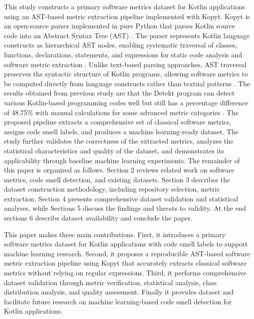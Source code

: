 \documentclass[]{einformatica}
\begin{document}
This study constructs a primary software metrics dataset for Kotlin applications using an AST-based metric extraction pipeline implemented with Kopyt. Kopyt is an open-source parser implemented in pure Python that parses Kotlin source code into an Abstract Syntax Tree (AST) \cite{pypi_kopyt}. The parser represents Kotlin language constructs as hierarchical AST nodes, enabling systematic traversal of classes, functions, declarations, statements, and expressions for static code analysis and software metric extraction \cite{kotlin_spec}. Unlike text-based parsing approaches, AST traversal preserves the syntactic structure of Kotlin programs, allowing software metrics to be computed directly from language constructs rather than textual patterns \cite{chen2023acerastbasedgraphgenerator}. The results obtained from previous study are that the Detekt program can detect various Kotlin-based programming codes well but still has a percentage difference of 48.75\% with manual calculations for some advanced metric categories \cite{WibowoICITDA2025}. The proposed pipeline extracts a comprehensive set of classical software metrics, assigns code smell labels, and produces a machine learning-ready dataset. The study further validates the correctness of the extracted metrics, analyzes the statistical characteristics and quality of the dataset, and demonstrates its applicability through baseline machine learning experiments. The remainder of this paper is organized as follows. Section 2 reviews related work on software metrics, code smell detection, and existing datasets. Section 3 describes the dataset construction methodology, including repository selection, metric extraction. Section 4 presents comprehensive dataset validation and statistical analyses, while Sections 5 discuss the findings and threats to validity. At the end sections 6 describe dataset availability and conclude the paper.

This paper makes three main contributions. First, it introduces a primary software metrics dataset for Kotlin applications with code smell labels to support machine learning research. Second, it proposes a reproducible AST-based software metric extraction pipeline using Kopyt that accurately extracts classical software metrics without relying on regular expressions. Third, it performs comprehensive dataset validation through metric verification, statistical analysis, class distribution analysis, and quality assessment. Finally it provides dataset and facilitate future research on machine learning-based code smell detection for Kotlin applications.
\end{document}
